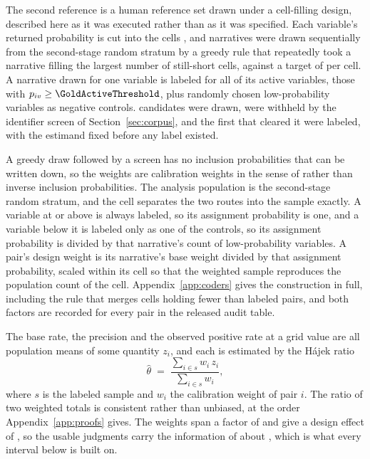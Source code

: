 The second reference is a human reference set drawn under a cell-filling design, described
here as it was executed rather than as it was specified. Each variable's returned probability is
cut into the cells \GoldBinsText{}, and narratives were drawn sequentially from the second-stage
random stratum by a greedy rule that repeatedly took a narrative filling the largest number of
still-short cells, against a target of \GoldBinTargets{} per cell. A narrative drawn for one
variable is labeled for all of its active variables, those with
$p_{iv} \ge \GoldActiveThreshold$, plus \GoldNegControls{} randomly chosen low-probability
variables as negative controls. \DesignNCandidates{} candidates were drawn, \DesignNWithheld{}
were withheld by the identifier screen of Section~\ref{sec:corpus}, and the first
\GoldNarratives{} that cleared it were labeled, with the estimand fixed before any label
existed.

A greedy draw followed by a screen has no inclusion probabilities that can be written down, so
the weights are calibration weights in the sense of \citet{deville1992calibration} rather than
inverse inclusion probabilities. The analysis population is the second-stage random stratum, and
the cell separates the two routes into the sample exactly. A variable at or above
\GoldActiveThreshold{} is always labeled, so its assignment probability is one, and a variable
below it is labeled only as one of the \GoldNegControls{} controls, so its assignment
probability is \GoldNegControls{} divided by that narrative's count of low-probability
variables. A pair's design weight is its narrative's base weight divided by that assignment
probability, scaled within its cell so that the weighted sample reproduces the population count
of the cell. Appendix~\ref{app:coders} gives the construction in full, including the rule that
merges cells holding fewer than \DesignMinCell{} labeled pairs, and both factors are recorded
for every pair in the released audit table.

The base rate, the precision and the observed positive rate at a grid value are all population
means of some quantity $z_i$, and each is estimated by the H\'ajek ratio
\begin{equation}
\hat{\theta} \;=\; \frac{\sum_{i \in s} w_i\, z_i}{\sum_{i \in s} w_i},
\label{eq:ht}
\end{equation}
where $s$ is the labeled sample and $w_i$ the calibration weight of pair $i$. The ratio of two
weighted totals is consistent rather than unbiased, at the order Appendix~\ref{app:proofs}
gives. The weights span a factor of \DesignWeightRatio{} and give a design effect of
\DesignDeff{}, so the \GoldNUsable{} usable judgments carry the information of about
\DesignNEff{}, which is what every interval below is built on.

